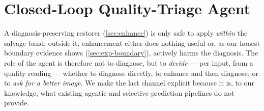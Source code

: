 
\section{Closed-Loop Quality-Triage Agent}\label{sec:agent}

A diagnosis-preserving restorer (\cref{sec:enhance}) is only safe to apply \emph{within} the
salvage band; outside it, enhancement either does nothing useful or, as our honest boundary
evidence shows (\cref{sec:exp-boundary}), actively harms the diagnosis. The role of the agent is
therefore not to diagnose, but to \emph{decide} --- per input, from a quality reading --- whether
to diagnose directly, to enhance and then diagnose, or to \emph{ask for a better image}. We make
the last channel explicit because it is, to our knowledge, what existing agentic and
selective-prediction pipelines do not provide.

